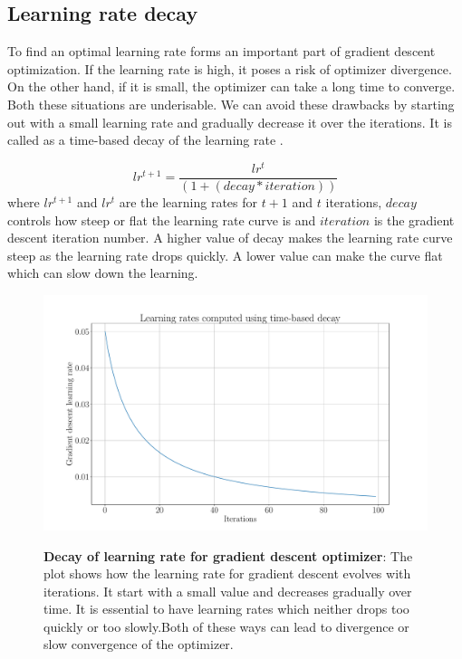 \subsection{Learning rate decay}
To find an optimal learning rate forms an important part of gradient descent optimization. If the learning rate is high, it poses a risk of optimizer divergence. On the other hand, if it is small, the optimizer can take a long time to converge. Both these situations are underisable. We can avoid these drawbacks by starting out with a small learning rate and gradually decrease it over the iterations. It is called as a time-based decay of the learning rate \cite{articleRuderS}.

\begin{equation}
lr^{t+1} = \frac{lr^t}{( 1 + ( decay * iteration ) )}
\end{equation}
where $lr^{t+1}$ and $lr^t$ are the learning rates for $t+1$ and $t$ iterations,   $decay$ controls how steep or flat the learning rate curve is and $iteration$ is the gradient descent iteration number. A higher value of decay makes the learning rate curve steep as the learning rate drops quickly. A lower value can make the curve flat which can slow down the learning.

\begin{figure}[h]
\begin{centering}
    {\includegraphics[scale=0.35]{figures/Learning_rates.pdf}}
    \caption[Decay of learning rate for gradient descent optimizer]{\textbf{Decay of learning rate for gradient descent optimizer}: The plot shows how the learning rate for gradient descent evolves with iterations. It start with a small value and decreases gradually over time. It is essential to have learning rates which neither drops too quickly or too slowly.Both of these ways can lead to divergence or slow convergence of the optimizer.}
\end{centering}
\end{figure}

